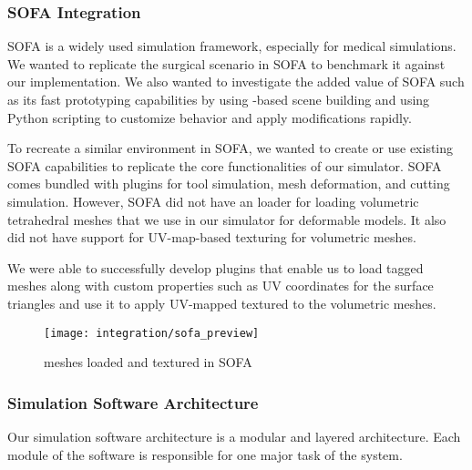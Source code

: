 \subsubsection{SOFA Integration}
SOFA is a widely used simulation framework, especially for medical simulations. We wanted to replicate the surgical scenario in SOFA to benchmark it against our implementation. We also wanted to investigate the added value of SOFA such as its fast prototyping capabilities by using -based scene building and using Python scripting to customize behavior and apply modifications rapidly.

To recreate a similar environment in SOFA, we wanted to create or use existing SOFA capabilities to replicate the core functionalities of our simulator. SOFA comes bundled with plugins for tool simulation, mesh deformation, and cutting simulation. However, SOFA did not have an  loader for loading volumetric tetrahedral meshes that we use in our simulator for deformable models. It also did not have support for UV-map-based texturing for volumetric meshes.

We were able to successfully develop plugins that enable us to load tagged  meshes along with custom properties such as UV coordinates for the surface triangles and use it to apply UV-mapped textured to the volumetric meshes.

\begin{figure}
  \centering
  \texttt{[image: integration/sofa\_preview]}
  \caption{ meshes loaded and textured in SOFA}\label{fig:sofa_preview}
\end{figure}

\subsubsection{Simulation Software Architecture}\label{sec:software_architecture}
Our simulation software architecture is a modular and layered architecture. Each module of the software is responsible for one major task of the system.

